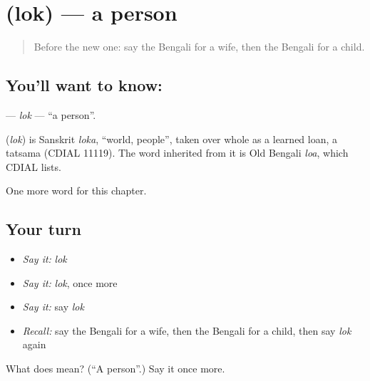 \section[\texorpdfstring{\bn{লোক} (lok)}{লোক (lok)}]{ (lok) — a person}

\label{lesson:BN-C47-lok}



\begin{quote}
Before the new one: say the Bengali for a wife, then the Bengali for a child.
\end{quote}

\subsection*{You'll want to know: }
\textbf{} — \emph{lok} — \textquotedblleft{}a person\textquotedblright{}.

\begin{cousinweb}
\textbf{} (\emph{lok}) is Sanskrit \emph{loka}, \textquotedblleft{}world, people\textquotedblright{}, taken over whole as a learned loan, a tatsama (CDIAL 11119). The word inherited from it is Old Bengali \emph{loa}, which CDIAL lists.
\end{cousinweb}

\begin{grammarlens}[title={What you've built}]
One more word for this chapter.
\end{grammarlens}

\subsection*{Your turn}
\begin{itemize}
\raggedright
  \item \emph{Say it:} \emph{lok}
  \item \emph{Say it:} \emph{lok}, once more
  \item \emph{Say it:} say \emph{lok}
  \item \emph{Recall:} say the Bengali for a wife, then the Bengali for a child, then say \emph{lok} again
\end{itemize}

\begin{tcolorbox}[breakable,colback=teal!4,colframe=teal!35!black,title={Before you move on}]
What does  mean? (\textquotedblleft{}A person\textquotedblright{}.) Say it once more.
\end{tcolorbox}

